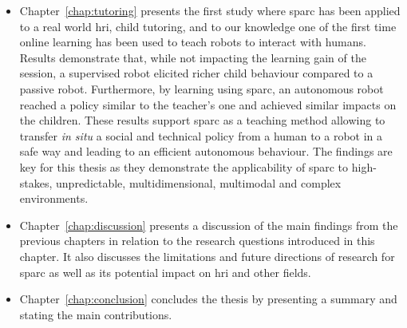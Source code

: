 \begin{itemize}
	\item Chapter~\ref{chap:tutoring} presents the first study where \gls{sparc} has been applied to a real world \gls{hri}, child tutoring, and to our knowledge one of the first time online learning has been used to teach robots to interact with humans. Results demonstrate that, while not impacting the learning gain of the session, a supervised robot elicited richer child behaviour compared to a passive robot. Furthermore, by learning using \gls{sparc}, an autonomous robot reached a policy similar to the teacher's one and achieved similar impacts on the children. These results support \gls{sparc} as a teaching method allowing to transfer \textit{in situ} a social and technical policy from a human to a robot in a safe way and leading to an efficient autonomous behaviour. The findings are key for this thesis as they demonstrate the applicability of \gls{sparc} to high-stakes, unpredictable, multidimensional, multimodal and complex environments.
	
	\item Chapter~\ref{chap:discussion} presents a discussion of the main findings from the previous chapters in relation to the research questions introduced in this chapter. It also discusses the limitations and future directions of research for \gls{sparc} as well as its potential impact on \gls{hri} and other fields.

	\item Chapter~\ref{chap:conclusion} concludes the thesis by presenting a summary and stating the main contributions.
	
\end{itemize}
